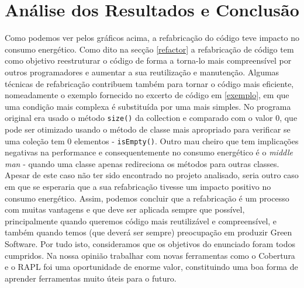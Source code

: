 \chapter{Análise dos Resultados e Conclusão}

Como podemos ver pelos gráficos acima, a refabricação do código teve impacto no consumo energético. Como dito na secção \ref{refactor} a refabricação de código tem como objetivo reestruturar o código de forma a torna-lo mais compreensível por outros programadores e aumentar a sua reutilização e manutenção. Algumas técnicas de refabricação contribuem também para tornar o código mais eficiente, nomeadamente o exemplo fornecido no excerto de código em \ref{exemplo}, em que uma condição mais complexa é substituída por uma mais simples. No programa original era usado o método \texttt{size()} da collection e comparado com o valor $0$, que pode ser otimizado usando o método de classe mais apropriado para verificar se uma coleção tem $0$ elementos - \texttt{isEmpty()}. 
\newline
Outro mau cheiro que tem implicações negativas na performance e consequentemente no consumo energético é o \textit{middle man} - quando uma classe apenas redireciona os métodos para outras classes. Apesar de este caso não ter sido encontrado no projeto analisado, seria outro caso em que se esperaria que a sua refabricação tivesse um impacto positivo no consumo energético.
\newline
Assim, podemos concluir que a refabricação é um processo com muitas vantagens e que deve ser aplicada sempre que possível, principalmente quando queremos código mais reutilizável e compreensível, e também quando temos (que deverá ser sempre) preocupação em produzir Green Software.
\newline
Por tudo isto, consideramos que os objetivos do enunciado foram todos cumpridos. Na nossa opinião trabalhar com novas ferramentas como o Cobertura e o RAPL foi uma oportunidade de enorme valor, constituindo uma boa forma de aprender ferramentas muito úteis para o futuro.